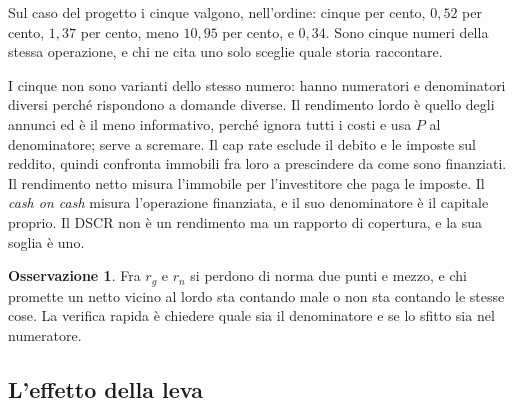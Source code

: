 \documentclass[11pt,a4paper]{article}
\theoremstyle{definition}
\newtheorem{osservazione}[definizione]{Osservazione}
\theoremstyle{plain}
\begin{document}
Sul caso del progetto i cinque valgono, nell'ordine: cinque per cento, $0{,}52$ per cento, $1{,}37$ per cento, meno $10{,}95$ per cento, e $0{,}34$. Sono cinque numeri della stessa operazione, e chi ne cita uno solo sceglie quale storia raccontare.

I cinque non sono varianti dello stesso numero: hanno numeratori e denominatori diversi perché rispondono a domande diverse. Il rendimento lordo è quello degli annunci ed è il meno informativo, perché ignora tutti i costi e usa $P$ al denominatore; serve a scremare. Il cap rate esclude il debito e le imposte sul reddito, quindi confronta immobili fra loro a prescindere da come sono finanziati. Il rendimento netto misura l'immobile per l'investitore che paga le imposte. Il \emph{cash on cash} misura l'operazione finanziata, e il suo denominatore è il capitale proprio. Il DSCR non è un rendimento ma un rapporto di copertura, e la sua soglia è uno.

\begin{osservazione}
Fra $r_g$ e $r_n$ si perdono di norma due punti e mezzo, e chi promette un netto vicino al lordo sta contando male o non sta contando le stesse cose. La verifica rapida è chiedere quale sia il denominatore e se lo sfitto sia nel numeratore.
\end{osservazione}

\subsection{L'effetto della leva}
\end{document}
